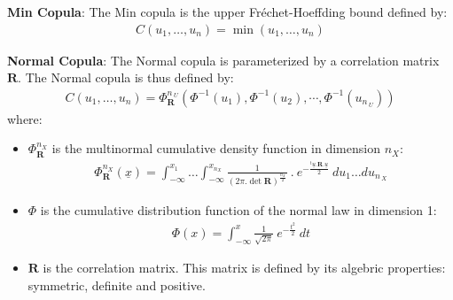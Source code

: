 {  {\bf Min Copula}: The Min copula is the upper Fr\'echet-Hoeffding bound defined by:
  \begin{align*}
    C(u_1, \dots, u_n) = \min(u_1,\dots,u_n)
  \end{align*}


  {\bf Normal Copula}: The Normal copula is parameterized by a correlation matrix $\mathbf R$. The Normal copula is thus defined by:
  \begin{align*}
    C(u_1, \dots, u_n)  = \Phi_{\mathbf R}^{n_{\:U}}\left(\Phi^{-1}(u_1),\Phi^{-1}(u_2),\cdots,\Phi^{-1}(u_{n_{\:U}}) \right)
  \end{align*}
  where:
  \begin{itemize}
  \item $\Phi_{\mathbf R}^{n_{X}}$ is the multinormal cumulative density function in dimension ${n_{X}}$:
    \begin{align*}
      \Phi_{\mathbf R}^{n_{X}}(\underline{x}) =  \int_{-\infty}^{x_1} \ldots \int_{-\infty}^{x_{n_{X}}} \frac{1}{{(2\pi.\det{\mathbf R})}^{\frac{n_{X}}{2}}} \: . \: e^{-\frac{^t\underline{u}.\mathbf R.\underline{u}}{2}} \: du_1\ldots du_{n_{\:X}}
    \end{align*}
  \item $\Phi$ is the cumulative distribution function of the normal law in dimension 1:
    \begin{align*}
      \Phi(x) = \int_{-\infty}^x \frac{1}{\sqrt{2\pi}} \: e^{-\frac{t^2}{2}} \: dt
    \end{align*}
  \item $\mathbf R$ is the correlation matrix. This matrix is defined by its algebric properties: symmetric, definite and positive. \\
  \end{itemize}


}
